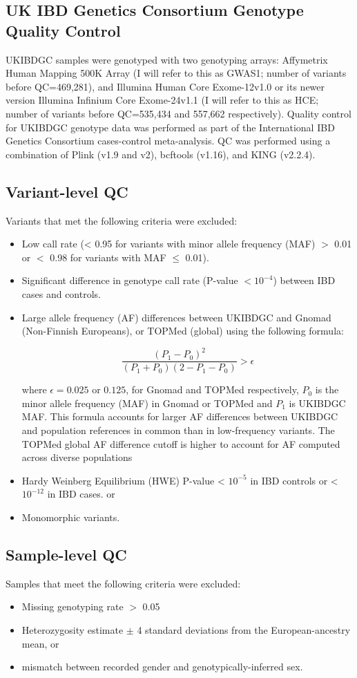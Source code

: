 \subsection{UK IBD Genetics Consortium Genotype Quality Control}
UKIBDGC samples were genotyped with two genotyping arrays: Affymetrix Human Mapping 500K Array (I will refer to this as GWAS1; number of variants before QC=469,281), and Illumina Human Core Exome-12v1.0 or its newer version Illumina Infinium Core Exome-24v1.1 (I will refer to this as HCE; number of variants before QC=535,434 and 557,662 respectively). Quality control for UKIBDGC genotype data was performed as part of the International IBD Genetics Consortium cases-control meta-analysis. QC was performed using a combination of Plink (v1.9 and v2), bcftools (v1.16), and KING (v2.2.4).
\subsection{Variant-level QC}
Variants that met the following criteria were excluded: 
\begin{itemize}
  \item Low call rate (< 0.95 for variants with minor allele frequency (MAF) $>$ 0.01 or $<$ 0.98 for variants with MAF $\leq$ 0.01).
  \item Significant difference in genotype call rate (P-value $< 10^{-4}$) between IBD cases and controls.
  \item Large allele frequency (AF) differences between UKIBDGC and Gnomad (Non-Finnish Europeans), or TOPMed (global) using the following formula:

$$\frac{(P_{1}-P_{0})^{2}}{(P_{1}+P_{0})(2-P_{1}-P_{0})} > \epsilon$$ 


where $\epsilon=0.025$ or $0.125$, for Gnomad and TOPMed respectively,  $P_{0}$ is the minor allele frequency (MAF) in Gnomad or TOPMed and $P_{1}$ is UKIBDGC MAF. This formula accounts for larger AF differences between UKIBDGC and population references in common than in low-frequency variants. The TOPMed global AF difference cutoff is higher to account for AF computed across diverse populations
\item Hardy Weinberg Equilibrium (HWE) P-value < $10^{-5}$ in IBD controls or < $10^{-12}$ in IBD cases.
 or 
\item Monomorphic variants. 
\end{itemize}

\subsection{Sample-level QC}
Samples that meet the following criteria were excluded:
\begin{itemize}
\item Missing genotyping rate $>$ 0.05
\item Heterozygosity estimate $\pm$ 4 standard deviations from the European-ancestry mean, or 
\item mismatch between recorded gender and genotypically-inferred sex. 
\end{itemize}
